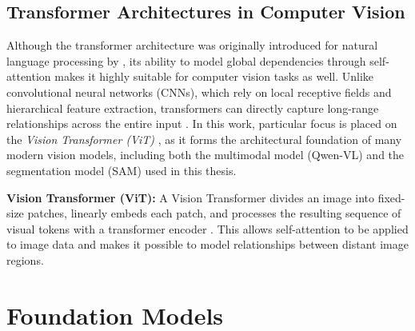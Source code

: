 \subsection{Transformer Architectures in Computer Vision}

Although the transformer architecture was originally introduced for natural language processing by \cite{VaswaniTransformerBase}, its ability to model global dependencies through self-attention makes it highly suitable for computer vision tasks as well. Unlike convolutional neural networks (CNNs), which rely on local receptive fields and hierarchical feature extraction, transformers can directly capture long-range relationships across the entire input \citep{pereira2024reviewtransformerbasedmodelscomputer}. In this work, particular focus is placed on the \emph{Vision Transformer (ViT)} \citep{DosovitskiyTransformer}, as it forms the architectural foundation of many modern vision models, including both the multimodal model (Qwen-VL) and the segmentation model (SAM) used in this thesis.

\textbf{Vision Transformer (ViT):}
A Vision Transformer divides an image into fixed-size patches, linearly embeds each patch, and processes the resulting sequence of visual tokens with a transformer encoder \citep{DosovitskiyTransformer}. This allows self-attention to be applied to image data and makes it possible to model relationships between distant image regions.

\section{Foundation Models}
\label{sec:foundation_models}

